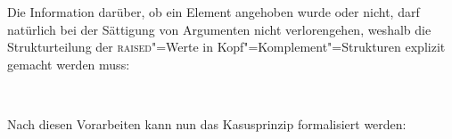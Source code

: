 {Die Information darüber, ob ein Element angehoben wurde oder nicht, darf natürlich
bei der Sättigung von Argumenten nicht verlorengehen, weshalb die Strukturteilung
der \textsc{raised}"=Werte in Kopf"=Komplement"=Strukturen explizit gemacht werden muss:
\begin{samepage}
\begin{schema}
\label{schema-bin-mark-final}
 \impl\\
\end{schema}
\end{samepage}


\noindent
Nach diesen Vorarbeiten kann nun das Kasusprinzip formalisiert werden:

}
